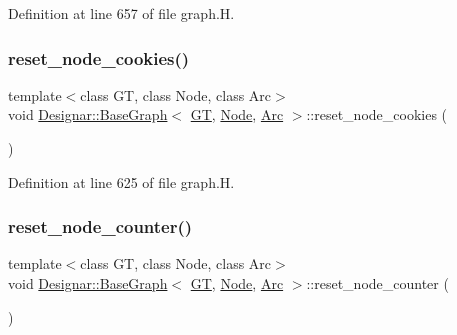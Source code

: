 Definition at line 657 of file graph.\+H.

\mbox{\label{class_designar_1_1_base_graph_ab797f80e7efa5a6d0b33f925d6079c18}} 
\subsubsection{\texorpdfstring{reset\+\_\+node\+\_\+cookies()}{reset\_node\_cookies()}}
{\footnotesize\ttfamily template$<$class GT, class Node, class Arc$>$ \\
void \hyperlink{class_designar_1_1_base_graph}{Designar\+::\+Base\+Graph}$<$ \hyperlink{demo-buildgraph_8_c_a3001c40d2c31ca87ed96cd7d1334a55e}{GT}, \hyperlink{namespace_designar_a5af326c65aa2bd26b26c410f2030d09e}{Node}, \hyperlink{namespace_designar_a3f55fb5513d62ff47cbc8f72b8e95d6f}{Arc} $>$\+::reset\+\_\+node\+\_\+cookies (\begin{DoxyParamCaption}{ }\end{DoxyParamCaption})\hspace{0.3cm}{\ttfamily [inline]}}



Definition at line 625 of file graph.\+H.

\mbox{\label{class_designar_1_1_base_graph_a53603f64b51b470cc6b8c8d6d2b643a4}} 
\subsubsection{\texorpdfstring{reset\+\_\+node\+\_\+counter()}{reset\_node\_counter()}}
{\footnotesize\ttfamily template$<$class GT, class Node, class Arc$>$ \\
void \hyperlink{class_designar_1_1_base_graph}{Designar\+::\+Base\+Graph}$<$ \hyperlink{demo-buildgraph_8_c_a3001c40d2c31ca87ed96cd7d1334a55e}{GT}, \hyperlink{namespace_designar_a5af326c65aa2bd26b26c410f2030d09e}{Node}, \hyperlink{namespace_designar_a3f55fb5513d62ff47cbc8f72b8e95d6f}{Arc} $>$\+::reset\+\_\+node\+\_\+counter (\begin{DoxyParamCaption}{ }\end{DoxyParamCaption})\hspace{0.3cm}{\ttfamily [inline]}}



